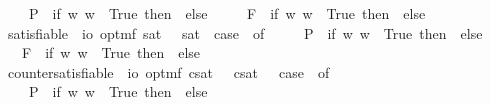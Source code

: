 \begin{isabellebody}
\ \ \ \ P{\isacharparenleft}{\isasympsi}{\isacharparenright}\ {\isasymRightarrow}\ if\ {\isasymforall}w{\isachardot}{\isacharparenleft}{\isasympsi}\ w{\isacharparenright}\ {\isasymlongleftrightarrow}\ True\ then\ {\isasymtop}\ else\ {\isasymbottom}\ \isanewline
\ \ {\isacharbar}\ F{\isacharparenleft}{\isasympsi}{\isacharparenright}\ {\isasymRightarrow}\ if\ {\isasymforall}w{\isachardot}{\isacharparenleft}{\isasympsi}\ w{\isacharparenright}\ {\isasymlongleftrightarrow}\ True\ then\ {\isasymtop}\ else\ {\isasymbottom}\ {\isacharbar}\ {\isacharunderscore}\ {\isasymRightarrow}\ {\isacharasterisk}{\isachardoublequoteclose}\isanewline
\ \isamarkupfalse%
\ satisfiable\ {\isacharcolon}{\isacharcolon}\ {\isachardoublequoteopen}io\ opt{\isasymRightarrow}mf{\isachardoublequoteclose}\ {\isacharparenleft}{\isachardoublequoteopen}{\isacharbrackleft}{\isacharunderscore}{\isacharbrackright}\isactrlsup s\isactrlsup a\isactrlsup t{\isachardoublequoteclose}\ {\isacharbrackleft}{}{\isacharbrackright}{\isacharparenright}\ \ {\isachardoublequoteopen}{\isacharbrackleft}{\isasymphi}{\isacharbrackright}\isactrlsup s\isactrlsup a\isactrlsup t\ {\isasymequiv}\ case\ {\isasymphi}\ of\ \isanewline
\ \ \ \ P{\isacharparenleft}{\isasympsi}{\isacharparenright}\ {\isasymRightarrow}\ if\ {\isasymexists}w{\isachardot}{\isacharparenleft}{\isasympsi}\ w{\isacharparenright}\ {\isasymlongleftrightarrow}\ True\ then\ {\isasymtop}\ else\ {\isasymbottom}\ \isanewline
\ \ {\isacharbar}\ F{\isacharparenleft}{\isasympsi}{\isacharparenright}\ {\isasymRightarrow}\ if\ {\isasymexists}w{\isachardot}{\isacharparenleft}{\isasympsi}\ w{\isacharparenright}\ {\isasymlongleftrightarrow}\ True\ then\ {\isasymtop}\ else\ {\isasymbottom}\ {\isacharbar}\ {\isacharunderscore}\ {\isasymRightarrow}\ {\isacharasterisk}{\isachardoublequoteclose}\isanewline
\ \isamarkupfalse%
\ countersatisfiable\ {\isacharcolon}{\isacharcolon}\ {\isachardoublequoteopen}io\ opt{\isasymRightarrow}mf{\isachardoublequoteclose}\ {\isacharparenleft}{\isachardoublequoteopen}{\isacharbrackleft}{\isacharunderscore}{\isacharbrackright}\isactrlsup c\isactrlsup s\isactrlsup a\isactrlsup t{\isachardoublequoteclose}\ {\isacharbrackleft}{}{\isacharbrackright}{\isacharparenright}\ \ {\isachardoublequoteopen}{\isacharbrackleft}{\isasymphi}{\isacharbrackright}\isactrlsup c\isactrlsup s\isactrlsup a\isactrlsup t\ {\isasymequiv}\ \ case\ {\isasymphi}\ of\ \isanewline
\ \ \ \ P{\isacharparenleft}{\isasympsi}{\isacharparenright}\ {\isasymRightarrow}\ if\ {\isasymexists}w{\isachardot}{\isasymnot}{\isacharparenleft}{\isasympsi}\ w{\isacharparenright}\ {\isasymlongleftrightarrow}\ True\ then\ {\isasymtop}\ else\ {\isasymbottom}\ \isanewline

\end{isabellebody}
